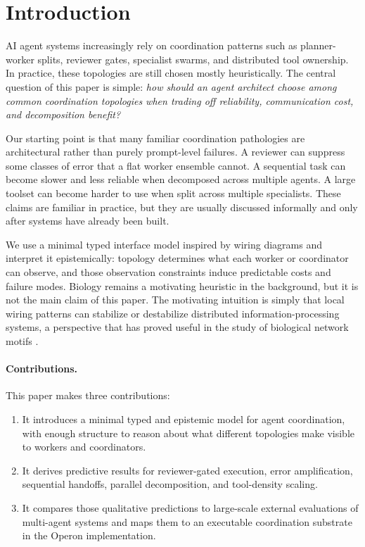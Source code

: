 \section{Introduction}

AI agent systems increasingly rely on coordination patterns such as planner-worker splits, reviewer
gates, specialist swarms, and distributed tool ownership. In practice, these topologies are still
chosen mostly heuristically. The central question of this paper is simple:
\emph{how should an agent architect choose among common coordination topologies when trading off
reliability, communication cost, and decomposition benefit?}

Our starting point is that many familiar coordination pathologies are architectural rather than purely
prompt-level failures. A reviewer can suppress some classes of error that a flat worker ensemble cannot.
A sequential task can become slower and less reliable when decomposed across multiple agents. A large
toolset can become harder to use when split across multiple specialists. These claims are familiar in
practice, but they are usually discussed informally and only after systems have already been built.

We use a minimal typed interface model inspired by wiring diagrams and interpret it epistemically:
topology determines what each worker or coordinator can observe, and those observation constraints induce
predictable costs and failure modes. Biology remains a motivating heuristic in the background, but it is
not the main claim of this paper. The motivating intuition is simply that local wiring patterns can
stabilize or destabilize distributed information-processing systems, a perspective that has proved useful
in the study of biological network motifs \cite{milo2002network,alon2007network}.

\paragraph{Contributions.}
This paper makes three contributions:
\begin{enumerate}[leftmargin=*]
\item It introduces a minimal typed and epistemic model for agent coordination, with enough structure to
reason about what different topologies make visible to workers and coordinators.
\item It derives predictive results for reviewer-gated execution, error amplification, sequential
handoffs, parallel decomposition, and tool-density scaling.
\item It compares those qualitative predictions to large-scale external evaluations of multi-agent
systems and maps them to an executable coordination substrate in the Operon implementation.
\end{enumerate}

